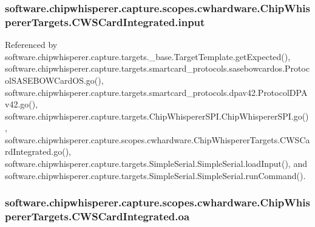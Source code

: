 \subsubsection[{input}]{\setlength{\rightskip}{0pt plus 5cm}software.\+chipwhisperer.\+capture.\+scopes.\+cwhardware.\+Chip\+Whisperer\+Targets.\+C\+W\+S\+Card\+Integrated.\+input}\label{classsoftware_1_1chipwhisperer_1_1capture_1_1scopes_1_1cwhardware_1_1ChipWhispererTargets_1_1CWSCardIntegrated_af0c9a44dafea1aff3579ccfd1211e41a}


Referenced by software.\+chipwhisperer.\+capture.\+targets.\+\_\+base.\+Target\+Template.\+get\+Expected(), software.\+chipwhisperer.\+capture.\+targets.\+smartcard\+\_\+protocols.\+sasebowcardos.\+Protocol\+S\+A\+S\+E\+B\+O\+W\+Card\+O\+S.\+go(), software.\+chipwhisperer.\+capture.\+targets.\+smartcard\+\_\+protocols.\+dpav42.\+Protocol\+D\+P\+Av42.\+go(), software.\+chipwhisperer.\+capture.\+targets.\+Chip\+Whisperer\+S\+P\+I.\+Chip\+Whisperer\+S\+P\+I.\+go(), software.\+chipwhisperer.\+capture.\+scopes.\+cwhardware.\+Chip\+Whisperer\+Targets.\+C\+W\+S\+Card\+Integrated.\+go(), software.\+chipwhisperer.\+capture.\+targets.\+Simple\+Serial.\+Simple\+Serial.\+load\+Input(), and software.\+chipwhisperer.\+capture.\+targets.\+Simple\+Serial.\+Simple\+Serial.\+run\+Command().

\hypertarget{classsoftware_1_1chipwhisperer_1_1capture_1_1scopes_1_1cwhardware_1_1ChipWhispererTargets_1_1CWSCardIntegrated_a4e15c26159aa95c1a3c759087fcd7b17}{}
\subsubsection[{oa}]{\setlength{\rightskip}{0pt plus 5cm}software.\+chipwhisperer.\+capture.\+scopes.\+cwhardware.\+Chip\+Whisperer\+Targets.\+C\+W\+S\+Card\+Integrated.\+oa}\label{classsoftware_1_1chipwhisperer_1_1capture_1_1scopes_1_1cwhardware_1_1ChipWhispererTargets_1_1CWSCardIntegrated_a4e15c26159aa95c1a3c759087fcd7b17}


